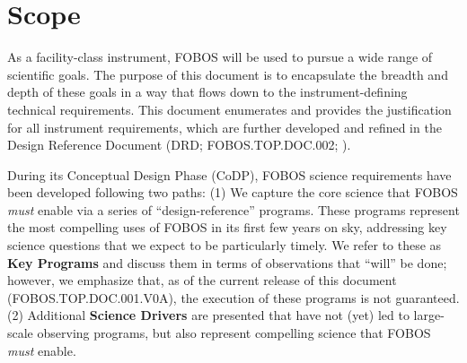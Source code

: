\documentclass[11pt,a4paper,twoside,onecolumn,openany,final,oldfontcommands]{memoir}
\newcommand{\project}{FOBOS}
\newcommand{\wbs}{TOP}
\newcommand{\doctype}{DOC}
\newcommand{\docnumber}{001}
\newcommand{\docversion}{0A}
\newcommand{\docsysnum}{{\project}.{\wbs}.{\doctype}.{\docnumber}.V{\docversion}}
\begin{document}



\section{Scope}

As a facility-class instrument, FOBOS will be used to pursue a wide range of scientific goals.  The purpose of this document is to encapsulate the breadth and depth of these goals in a way that flows down to the instrument-defining technical requirements.  This document enumerates and provides the justification for all instrument requirements, which are further developed and refined in the Design Reference Document (DRD; FOBOS.TOP.DOC.002; ).

During its Conceptual Design Phase (CoDP), FOBOS science requirements have been developed following two paths: (1) We capture the core science that FOBOS \textit{must} enable via a series of  ``design-reference'' programs.  These programs represent the most compelling uses of FOBOS in its first few years on sky, addressing key science questions that we expect to be particularly timely.  We refer to these as \textbf{Key Programs} and discuss them in terms of observations that ``will'' be done; however, we emphasize that, as of the current release of this document (\docsysnum), the execution of these programs is not guaranteed.  (2) Additional \textbf{Science Drivers} are presented that have not (yet) led to large-scale observing programs, but also represent compelling science that FOBOS \textit{must} enable.
\end{document}
